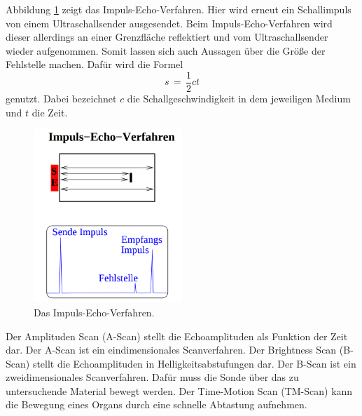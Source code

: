\documentclass[
  bibliography=totoc,     %
  captions=tableheading,  %
  titlepage=firstiscover, %
]{scrartcl}
\begin{document}
\noindent
Abbildung \ref{fig:US23} zeigt das Impuls-Echo-Verfahren. Hier wird erneut ein
Schallimpuls von einem Ultraschallsender ausgesendet. Beim
Impuls-Echo-Verfahren wird dieser allerdings an einer Grenzfläche reflektiert
und vom Ultraschallsender wieder aufgenommen. Somit lassen sich auch Aussagen
über die Größe der Fehlstelle machen. Dafür wird die Formel
\begin{equation}
  s\,=\, \frac{1}{2} c t
  \label{eqn:strecke}
\end{equation}
genutzt. Dabei bezeichnet $c$ die Schallgeschwindigkeit in dem jeweiligen
Medium und $t$ die Zeit.
\begin{figure}[H]
  \centering
  \includegraphics[width=0.5\textwidth]{US23.png}
  \caption{Das Impuls-Echo-Verfahren. \cite{anleitung}}
  \label{fig:US23}
\end{figure}
\noindent
Der Amplituden Scan (A-Scan) stellt die Echoamplituden als Funktion der Zeit
dar. Der A-Scan ist ein eindimensionales Scanverfahren.
Der Brightness Scan (B-Scan) stellt die Echoamplituden in
Helligkeitsabstufungen dar. Der B-Scan ist ein zweidimensionales Scanverfahren.
Dafür muss die Sonde über das zu untersuchende Material bewegt werden.
Der Time-Motion Scan (TM-Scan) kann die Bewegung eines Organs durch eine
schnelle Abtastung aufnehmen.
\end{document}
